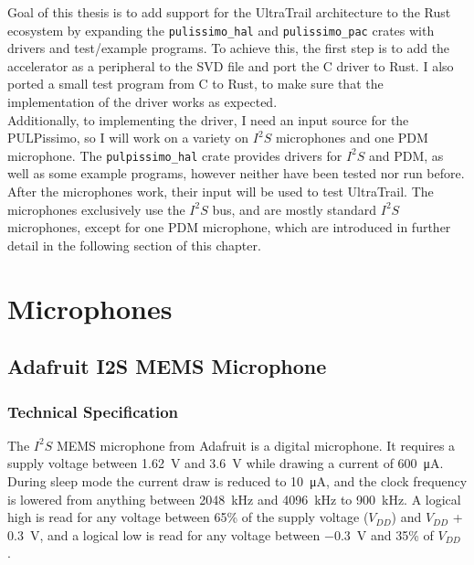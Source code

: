 

Goal of this thesis is to add support for the UltraTrail architecture to the Rust ecosystem by expanding the
\lstinline{pulissimo_hal} and \lstinline{pulissimo_pac} crates with drivers and test/example programs.
To achieve this, the first step is to add the accelerator as a peripheral to the SVD file and port the C driver to Rust.
I also ported a small test program from C to Rust, to make sure that the implementation of the driver works as expected.
\\
Additionally, to implementing the driver, I need an input source for the PULPissimo, so I will work on a variety on $I^2S$ microphones and one PDM microphone.
The \lstinline{pulpissimo_hal} crate provides drivers for $I^2S$ and PDM, as well as some example programs, however neither have been tested nor run before.
After the microphones work, their input will be used to test UltraTrail.
The microphones exclusively use the $I^2S$ bus, and are mostly standard $I^2S$ microphones, except for one PDM microphone,
which are introduced in further detail in the following section of this chapter.

\section{Microphones}

\subsection{Adafruit I2S MEMS Microphone}

\subsubsection{Technical Specification}

The $I^2S$ MEMS microphone from Adafruit \cite{i2s_mic} is a digital microphone.
It requires a supply voltage between \SI{1.62}{\volt} and \SI{3.6}{\volt} while drawing a current of \SI{600}{\micro\ampere}.
During sleep mode the current draw is reduced to \SI{10}{\micro\ampere}, and the clock frequency is lowered from anything between
\SI{2048}{\kilo\hertz} and \SI{4096}{\kilo\hertz} to \SI{900}{\kilo\hertz}.
A logical high is read for any voltage between 65\% of the supply voltage ($V_{DD}$) and $V_{DD}$ + \SI{0.3}{\volt},
and a logical low is read for any voltage between \SI{-0.3}{\volt} and 35\% of $V_{DD}$ \cite{i2s_mic_datasheet}.

